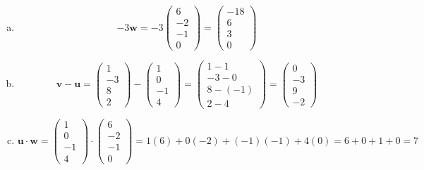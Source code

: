 \documentclass[11pt,letterpaper]{article}
\begin{document}
\sol 
\begin{enumerate}[(a)]
\item 
	\[
	-3 \mathbf{w}= -3 \begin{pmatrix} 6 \\ -2 \\ -1 \\ 0 \end{pmatrix}= \begin{pmatrix} -18 \\ 6 \\ 3 \\ 0 \end{pmatrix}
	\] \pspace

\item 
	\[
	\mathbf{v} - \mathbf{u}= \begin{pmatrix} 1 \\ -3 \\ 8 \\ 2 \end{pmatrix} - \begin{pmatrix} 1 \\ 0 \\ -1 \\ 4 \end{pmatrix}= \begin{pmatrix} 1 - 1 \\ -3 - 0 \\ 8 - (-1) \\ 2 - 4 \end{pmatrix}= \begin{pmatrix} 0 \\ -3 \\ 9 \\ -2 \end{pmatrix}
	\] \pspace

\item 
	\[
	\mathbf{u} \cdot \mathbf{w}= \begin{pmatrix} 1 \\ 0 \\ -1 \\ 4 \end{pmatrix} \cdot \begin{pmatrix} 6 \\ -2 \\ -1 \\ 0 \end{pmatrix}= 1(6) + 0(-2) + (-1)(-1) + 4(0)= 6 + 0 + 1 + 0= 7
	\]
\end{enumerate}
\end{document}
